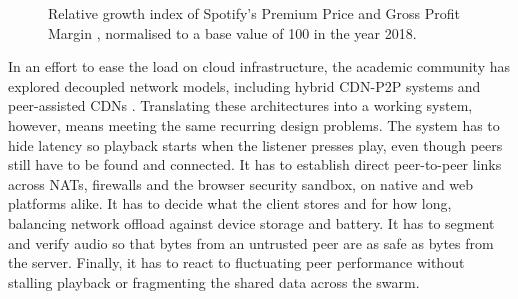 \begin{figure}[htbp]
    \centering
    \caption{Relative growth index of Spotify's Premium Price \cite{spotify_prices} and Gross Profit Margin \cite{spotify_gross_margin}, normalised to a base value of 100 in the year 2018.}
    \label{fig:spotify_economics_indexed}
\end{figure}

\par In an effort to ease the load on cloud infrastructure, the academic community has explored decoupled network models, including hybrid CDN-P2P systems and peer-assisted CDNs \cite{hybrid_cdn_p2p,pa_cdn_survey}. Translating these architectures into a working system, however, means meeting the same recurring design problems. The system has to hide latency so playback starts when the listener presses play, even though peers still have to be found and connected. It has to establish direct peer-to-peer links across NATs, firewalls and the browser security sandbox, on native and web platforms alike. It has to decide what the client stores and for how long, balancing network offload against device storage and battery. It has to segment and verify audio so that bytes from an untrusted peer are as safe as bytes from the server. Finally, it has to react to fluctuating peer performance without stalling playback or fragmenting the shared data across the swarm.

